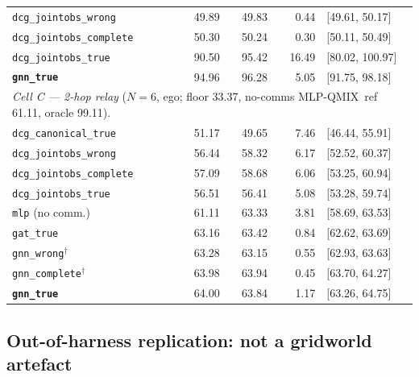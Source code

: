\documentclass[10pt]{article}
\makeatletter
\newcommand{\algoname}[1]{\textsc{#1}}
\newcommand{\mlpqmix}{\algoname{MLP-QMIX}}
\newcommand{\SCkTrue}{94.96}          %
\newcommand{\CBBdcgtrue}{90.50}        %
\newcommand{\CBBdcgtrueCI}{[80.02, 100.97]}
\newcommand{\CBBdcgtrueSD}{16.49}
\newcommand{\CBBwrong}{49.89}          %
\newcommand{\CBBcomplete}{50.30}       %
\newcommand{\CBCfloor}{33.37}
\newcommand{\CBCoracle}{99.11}
\newcommand{\CBCgnn}{64.00}            %
\newcommand{\CBCgnnMed}{63.84}
\newcommand{\CBCgnnCI}{[63.26, 64.75]}
\newcommand{\CBCgnnSD}{1.17}
\newcommand{\CBCgat}{63.16}            %
\newcommand{\CBCgatMed}{63.42}
\newcommand{\CBCgatSD}{0.84}
\newcommand{\CBCmlp}{61.11}            %
\newcommand{\CBCmlpMed}{63.33}
\newcommand{\CBCmlpCI}{[58.69, 63.53]}
\newcommand{\CBCmlpSD}{3.81}
\newcommand{\CBCdcgtrue}{56.51}        %
\newcommand{\CBCdcgtrueMed}{56.41}
\newcommand{\CBCdcgtrueSD}{5.08}
\newcommand{\CBCwrong}{56.44}          %
\newcommand{\CBCwrongMed}{58.32}
\newcommand{\CBCcomplete}{57.09}       %
\newcommand{\CBCcompleteMed}{58.68}
\newcommand{\CBCcanon}{51.17}          %
\newcommand{\CBCcanonMed}{49.65}
\newcommand{\CRcomplete}{63.98}        %
\newcommand{\CRcompleteMed}{63.94}
\newcommand{\CRcompleteSD}{0.45}
\newcommand{\CRcompleteCI}{[63.70, 64.27]}
\newcommand{\CRwrong}{63.28}           %
\newcommand{\CRwrongMed}{63.15}
\newcommand{\CRwrongSD}{0.55}
\newcommand{\CRwrongCI}{[62.93, 63.63]}
\makeatother
\begin{document}
\begin{table}[t]
\begin{tabular}{lrrrl}
    \texttt{dcg\_jointobs\_wrong}   & \CBBwrong    & 49.83 & 0.44 & [49.61, 50.17] \\
    \texttt{dcg\_jointobs\_complete}& \CBBcomplete & 50.24 & 0.30 & [50.11, 50.49] \\
    \texttt{dcg\_jointobs\_true}    & \CBBdcgtrue  & 95.42 & \CBBdcgtrueSD & \CBBdcgtrueCI \\
    \textbf{\texttt{gnn\_true}}     & \SCkTrue     & 96.28 & 5.05 & [91.75, 98.18] \\
    \midrule
    \multicolumn{5}{l}{\emph{Cell C --- 2-hop relay} ($N{=}6$, ego; floor \CBCfloor, no-comms \mlpqmix\ ref \CBCmlp, oracle \CBCoracle).} \\
    \texttt{dcg\_canonical\_true}   & \CBCcanon    & \CBCcanonMed    & 7.46 & [46.44, 55.91] \\
    \texttt{dcg\_jointobs\_wrong}   & \CBCwrong    & \CBCwrongMed    & 6.17 & [52.52, 60.37] \\
    \texttt{dcg\_jointobs\_complete}& \CBCcomplete & \CBCcompleteMed & 6.06 & [53.25, 60.94] \\
    \texttt{dcg\_jointobs\_true}    & \CBCdcgtrue  & \CBCdcgtrueMed  & \CBCdcgtrueSD & [53.28, 59.74] \\
    \texttt{mlp} (no comm.)         & \CBCmlp      & \CBCmlpMed      & \CBCmlpSD & \CBCmlpCI \\
    \texttt{gat\_true}              & \CBCgat      & \CBCgatMed      & \CBCgatSD & [62.62, 63.69] \\
    \texttt{gnn\_wrong}$^{\dagger}$    & \CRwrong    & \CRwrongMed    & \CRwrongSD    & \CRwrongCI \\
    \texttt{gnn\_complete}$^{\dagger}$ & \CRcomplete & \CRcompleteMed & \CRcompleteSD & \CRcompleteCI \\
    \textbf{\texttt{gnn\_true}}     & \CBCgnn      & \CBCgnnMed      & \CBCgnnSD & \CBCgnnCI \\
    \bottomrule
  \end{tabular}
\end{table}

\subsection{Out-of-harness replication: not a gridworld artefact}
\label{sec:structure:tokenmatch}
\end{document}

